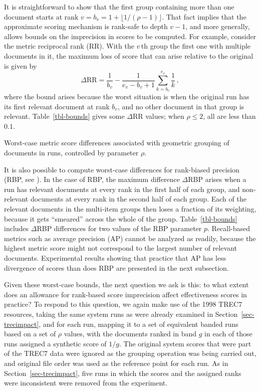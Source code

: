 
It is straightforward to show that the first group containing more
than one document starts at rank $v=b_v=1+\lfloor{1/(\rho-1)}\rfloor$.
That fact implies that the approximate scoring mechanism is rank-safe
to depth $v-1$, and more generally, allows bounds on the imprecision
in scores to be computed.
For example, consider the metric reciprocal rank (RR).
With the $v$\,th group the first one with multiple documents in it,
the maximum loss of score that can arise relative to the original is
given by
\[
	\Delta\mbox{RR} = \frac{1}{b_v} -
		\frac{1}{e_v-b_v+1}\sum_{k=b_v}^{e_v} \frac{1}{k} \,,
\]
where the bound arises because the worst situation is when the
original run has its first relevant document at rank $b_v$, and no
other document in that group is relevant.
Table~\ref{tbl-bounds} gives some $\Delta$RR values; when $\rho\le2$,
all are less than $0.1$.


\begin{table}[t]
\centering

\caption{Worst-case metric score differences associated with geometric
grouping of documents in runs, controlled by parameter $\rho$.
\label{tbl-bounds}}
\end{table}

It is also possible to compute worst-case differences for rank-biased
precision (RBP, see {\citet{mz08acmtois}}).
In the case of RBP, the maximum difference $\Delta$RBP arises when a
run has relevant documents at every rank in the first half of each
group, and non-relevant documents at every rank in the second half of
each group.
Each of the relevant documents in the multi-item groups then loses a
fraction of its weighting, because it gets ``smeared'' across the
whole of the group.
{}
Table~\ref{tbl-bounds} includes $\Delta$RBP differences for two
values of the RBP parameter $p$.
Recall-based metrics such as average precision (AP) cannot be
analyzed as readily, because the highest metric score might not
correspond to the largest number of relevant documents.
Experimental results showing that practice that AP has less
divergence of scores than does RBP are presented in the next
subsection.



Given these worst-case bounds, the next question we ask is this: to
what extent does an allowance for rank-based score imprecision affect
effectiveness scores in practice?
To respond to this question, we again make use of the 1998 TREC7
resources, taking the same system runs as were already examined in
Section~\ref{sec-trecimpact}, and for each run, mapping it to a set
of equivalent banded runs based on a set of $\rho$ values, with the
documents ranked in band $g$ in each of those runs assigned a
synthetic score of $1/g$.
The original system scores that were part of the TREC7 data were
ignored as the grouping operation was being carried out, and original
file order was used as the reference point for each run.
As in Section~\ref{sec-trecimpact}, five runs in which the scores and
the assigned ranks were inconsistent were removed from the
experiment.

